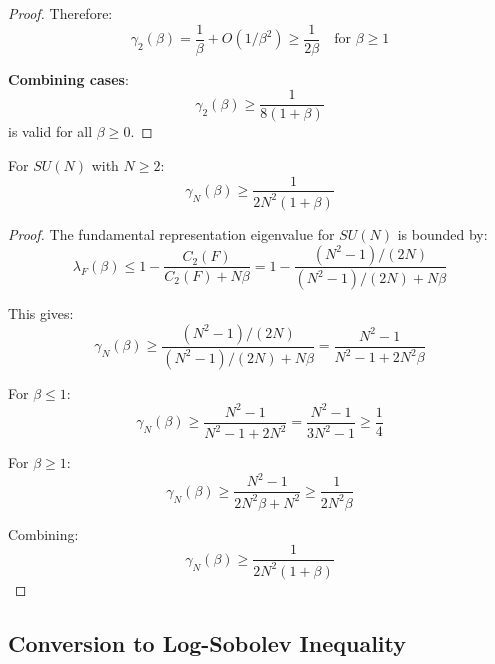 \begin{proof}
Therefore:
\begin{equation}
\gamma_2(\beta) = \frac{1}{\beta} + O(1/\beta^2) \geq \frac{1}{2\beta} \quad \text{for } \beta \geq 1
\end{equation}

\textbf{Combining cases}:
\begin{equation}
\gamma_2(\beta) \geq \frac{1}{8(1 + \beta)}
\end{equation}
is valid for all $\beta \geq 0$.
\end{proof}

\begin{theorem}
\label{thm:sun-explicit}
For $SU(N)$ with $N \geq 2$:
\begin{equation}
\gamma_N(\beta) \geq \frac{1}{2N^2(1 + \beta)}
\end{equation}
\end{theorem}

\begin{proof}
The fundamental representation eigenvalue for $SU(N)$ is bounded by:
\begin{equation}
\lambda_F(\beta) \leq 1 - \frac{C_2(F)}{C_2(F) + N\beta} = 1 - \frac{(N^2-1)/(2N)}{(N^2-1)/(2N) + N\beta}
\end{equation}

This gives:
\begin{equation}
\gamma_N(\beta) \geq \frac{(N^2-1)/(2N)}{(N^2-1)/(2N) + N\beta} = \frac{N^2-1}{N^2-1 + 2N^2\beta}
\end{equation}

For $\beta \leq 1$:
\begin{equation}
\gamma_N(\beta) \geq \frac{N^2-1}{N^2-1 + 2N^2} = \frac{N^2-1}{3N^2-1} \geq \frac{1}{4}
\end{equation}

For $\beta \geq 1$:
\begin{equation}
\gamma_N(\beta) \geq \frac{N^2-1}{2N^2\beta + N^2} \geq \frac{1}{2N^2\beta}
\end{equation}

Combining:
\begin{equation}
\gamma_N(\beta) \geq \frac{1}{2N^2(1 + \beta)}
\end{equation}
\end{proof}

\subsection{Conversion to Log-Sobolev Inequality}

